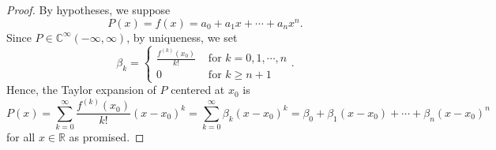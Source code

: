 \begin{Exercise}
\begin{proof}
By hypotheses, we suppose $$P(x) = f(x) = a_0+a_1 x + \cdots + a_n x^n.$$
Since $P\in \mathbb{C}^{\infty}(-\infty, \infty)$, by uniqueness, we set $$\beta_k = \begin{cases} \frac{f^{(k)}(x_0)}{k!} & \mbox{ for } k=0, 1, \cdots, n \\
0 & \mbox{ for } k \geq n+1 \end{cases}.$$
Hence, the Taylor expansion of $P$ centered at $x_0$ is $$P(x) = \sum_{k=0}^{\infty}\frac{f^{(k)}(x_0)}{k!} (x-x_0)^k =
\sum_{k=0}^{\infty}\beta_k (x-x_0)^k =
\beta_0 + \beta_1(x-x_0)+\cdots+\beta_n(x-x_0)^n$$ for all $x\in\mathbb{R}$ as promised.
\end{proof}
\end{Exercise}